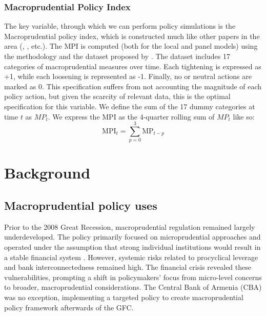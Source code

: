 \documentclass[12pt,a4paper]{article}
\begin{document}
\subsubsection{Macroprudential Policy Index}
The key variable, through which we can perform policy simulations is the Macroprudential policy index, which is constructed much like other papers in the area (\citep{galan2020}, \citep{esrb2019}, etc.). The MPI is computed (both for the local and panel models) using the methodology and the dataset proposed by \citet{alam2019}. The dataset includes 17 categories of macroprudential measures over time. Each tightening is expressed as +1, while each loosening is represented as -1. Finally, no or neutral actions are marked as 0. This specification suffers from not accounting the magnitude of each policy action, but given the scarcity of relevant data, this is the optimal specification for this variable. We define the sum of the 17 dummy categories at time $t$ as $MP_t$. We express the MPI as the 4-quarter rolling sum of $MP_t$ like so:
\begin{equation}
    \label{eq:local_mpi}
    \text{MPI}_t = \sum_{p=0}^{3} \text{MP}_{t-p}
\end{equation}


\section{Background}

\subsection{Macroprudential policy uses}
Prior to the 2008 Great Recession, macroprudential regulation remained largely underdeveloped. The policy primarily focused on microprudential approaches and operated under the assumption that strong individual institutions would result in a stable financial system \citep{galati2013}. However, systemic risks related to procyclical leverage and bank interconnectedness remained high. The financial crisis revealed these vulnerabilities, prompting a shift in policymakers' focus from micro-level concerns to broader, macroprudential considerations. The Central Bank of Armenia (CBA) was no exception, implementing a targeted policy to create macroprudential policy framework afterwards of the GFC.
\end{document}
